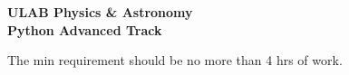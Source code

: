 \documentclass[addpoints,12pt]{exam}
\numberwithin{equation}{section}
\begin{document}
	
	\begin{center}
		\textbf{\Large{ULAB Physics \& Astronomy\\Python Advanced Track}}
	\end{center}

	The min requirement should be no more than 4 hrs of work. 
\end{document}
